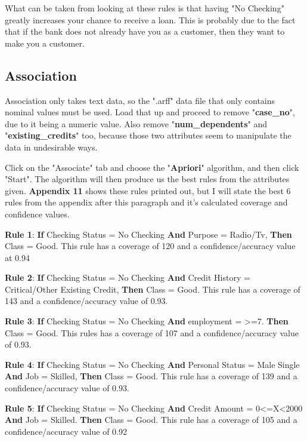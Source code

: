 \documentclass[12pt, a4paper]{article}
\begin{document}
    What can be taken from looking at these rules is that having "No Checking" greatly increases your chance to receive a loan. This is probably due to the fact that if the bank does not already have you as a customer, then they want to make you a customer.
    
    \subsection{Association}
    Association only takes text data, so the ".arff" data file that only contains nominal values must be used. Load that up and proceed to remove "\textbf{case\_no}", due to it being a numeric value. Also remove "\textbf{num\_dependents}" and "\textbf{existing\_credits}" too, because those two attributes seem to manipulate the data in undesirable ways.
    
    Click on the "Associate" tab and choose the "\textbf{Apriori}" algorithm, and then click "Start". The algorithm will then produce us the best rules from the attributes given. \textbf{Appendix 11} shows these rules printed out, but I will state the best 6 rules from the appendix after this paragraph and it's calculated coverage and confidence values.
    
    \textbf{Rule 1}: \textbf{If} Checking Status = No Checking \textbf{And} Purpose = Radio/Tv, \textbf{Then} Class = Good. This rule has a coverage of 120 and a confidence/accuracy value at 0.94
    
    \textbf{Rule 2}: \textbf{If} Checking Status = No Checking \textbf{And} Credit History = Critical/Other Existing Credit, \textbf{Then} Class = Good. This rule has a coverage of 143 and a confidence/accuracy value of 0.93.
    
    \textbf{Rule 3}: \textbf{If} Checking Status = No Checking \textbf{And} employment = >=7. \textbf{Then} Class = Good. This rules has a coverage of 107 and a confidence/accuracy value of 0.93.
    
    \textbf{Rule 4}: \textbf{If} Checking Status = No Checking \textbf{And} Personal Status = Male Single \textbf{And} Job = Skilled, \textbf{Then} Class = Good. This rule has a coverage of 139 and a confidence/accuracy value of 0.93.
    
    \textbf{Rule 5}: \textbf{If} Checking Status = No Checking \textbf{And} Credit Amount = 0<=X<2000 \textbf{And} Job = Skilled. \textbf{Then} Class = Good. This rule has a coverage of 105 and a confidence/accuracy value of 0.92
    
\end{document}
